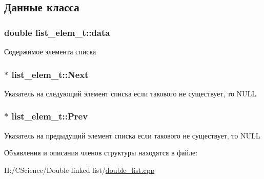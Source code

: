 \subsection{Данные класса}
\hypertarget{structlist__elem__t_acabfb252c5c40db408dba264843b0476}{
\subsubsection[{data}]{\setlength{\rightskip}{0pt plus 5cm}double {\bf list\_\-elem\_\-t::data}}}
\label{structlist__elem__t_acabfb252c5c40db408dba264843b0476}
Содержимое элемента списка \hypertarget{structlist__elem__t_aed10cd9b5fdb30bb6c2c04052c36145d}{
\subsubsection[{Next}]{$\ast$ {\bf list\_\-elem\_\-t::Next}}}
\label{structlist__elem__t_aed10cd9b5fdb30bb6c2c04052c36145d}
Указатель на следующий элемент списка если такового не существует, то NULL \hypertarget{structlist__elem__t_a01bae5033f32518295718a285da17524}{
\subsubsection[{Prev}]{$\ast$ {\bf list\_\-elem\_\-t::Prev}}}
\label{structlist__elem__t_a01bae5033f32518295718a285da17524}
Указатель на предыдущий элемент списка если такового не существует, то NULL 

Объявления и описания членов структуры находятся в файле:\begin{DoxyCompactItemize}
\item 
H:/CScience/Double-\/linked list/\hyperlink{double__list_8cpp}{double\_\-list.cpp}\end{DoxyCompactItemize}
